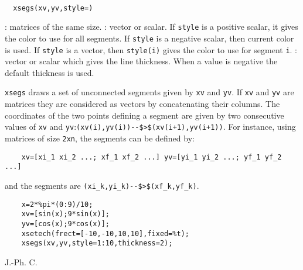 \begin{mandesc}
  \\
\end{mandesc}
\begin{calling_sequence}
\begin{verbatim}
  xsegs(xv,yv,style=)
\end{verbatim}
\end{calling_sequence}

\begin{parameters}
  \begin{varlist}
    : matrices of the same size.
    : vector or scalar. If \verb!style! is a positive scalar,
    it gives the color to use for all segments. If \verb!style! is
    a negative scalar, then current color is used. If \verb!style!
    is a vector, then \verb!style(i)! gives the color to use for
    segment \verb!i!.
    : vector or scalar which gives the line thickness. 
    When a value is negative the default thickness is used.
    \end{varlist}
\end{parameters}

\begin{mandescription}
  \verb!xsegs! draws a set of unconnected segments given by \verb!xv! and
  \verb!yv!. If \verb!xv! and \verb!yv! are matrices they are considered as
  vectors by concatenating their columns. The coordinates of the two points
  defining a segment are given by two consecutive values of \verb!xv! and
  \verb!yv!:\verb!(xv(i),yv(i))--$>$(xv(i+1),yv(i+1))!. For instance, using
  matrices of size \verb!2xn!, the segments can be defined by:
  \begin{Verbatim}
    xv=[xi_1 xi_2 ...; xf_1 xf_2 ...] yv=[yi_1 yi_2 ...; yf_1 yf_2  ...]
  \end{Verbatim}
  and the segments are \verb!(xi_k,yi_k)--$>$(xf_k,yf_k)!.
\end{mandescription}
\begin{examples}
  \begin{Verbatim}
    x=2*%pi*(0:9)/10;
    xv=[sin(x);9*sin(x)];
    yv=[cos(x);9*cos(x)];
    xsetech(frect=[-10,-10,10,10],fixed=%t);
    xsegs(xv,yv,style=1:10,thickness=2);
  \end{Verbatim}
\end{examples}
\begin{authors}
  J.-Ph. C.
\end{authors}

